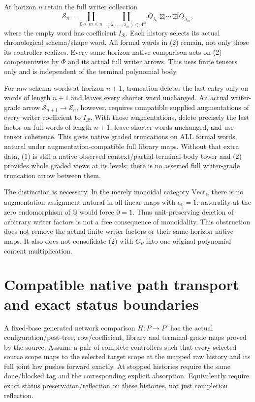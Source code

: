 \documentclass[11pt]{article}
\begin{document}
At horizon $n$ retain the full writer collection
\[
 \mathcal S_n=
 \coprod_{0\leq m\leq n}\ \coprod_{(\lambda_1,\ldots,\lambda_m)\in\Lambda^m}
 Q_{\lambda_1}\boxtimes\cdots\boxtimes Q_{\lambda_m},      \tag{2}
\]
where the empty word has coefficient $I_{\mathcal R}$. Each history selects
its actual chronological schema/shape word. All formal words in (2) remain,
not only those its controller realizes. Every same-horizon native comparison
acts on (2) componentwise by $\Phi$ and its actual full writer arrows. This
uses finite tensors only and is independent of the terminal polynomial body.

For raw schema words at horizon $n+1$, truncation deletes the last entry
only on words of length $n+1$ and leaves every shorter word unchanged.
An actual writer-grade arrow $\mathcal S_{n+1}\to\mathcal S_n$, however,
requires compatible supplied augmentations of every writer coefficient to
$I_{\mathcal R}$. With those augmentations, delete precisely the last factor
on full words of length $n+1$, leave shorter words unchanged, and use tensor
coherence. This gives native graded truncations on ALL formal words, natural
under augmentation-compatible full library maps. Without that extra data,
(1) is still a native observed context/partial-terminal-body tower and (2)
provides whole graded views at its levels; there is no asserted full
writer-grade truncation arrow between them.

The distinction is necessary. In the merely monoidal category
$\mathrm{Vect}_{\mathbb Q}$ there is no augmentation assignment natural in
all linear maps with $\epsilon_{\mathbb Q}=1$: naturality at the zero
endomorphism of $\mathbb Q$ would force $0=1$. Thus unit-preserving deletion
of arbitrary writer factors is not a free consequence of monoidality.
This obstruction does not remove the actual finite writer factors or their
same-horizon native maps. It also does not consolidate (2) with $C_P$ into
one original polynomial content multiplication.

\section{Compatible native path transport and exact status boundaries}
A fixed-base generated network comparison $H:P\to P'$ has the actual
configuration/post-tree, row/coefficient, library and terminal-grade maps
proved by the source. Assume a pair of complete controllers such that every
selected source scope maps to the selected target scope at the mapped raw
history and its full joint law pushes forward exactly. At stopped histories
require the same done/blocked tag and the corresponding explicit absorption.
Equivalently require exact status preservation/reflection on these histories,
not just completion reflection.
\end{document}
